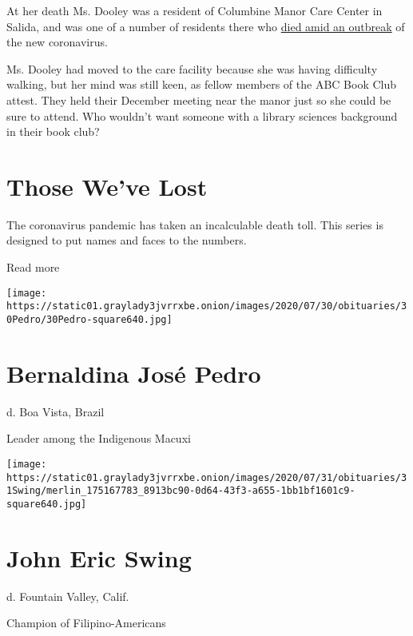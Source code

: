 At her death Ms. Dooley was a resident of Columbine Manor Care Center in
Salida, and was one of a number of residents there who
\href{https://arkvalleyvoice.com/four_additional_covid_19_cases_staff_at-columbine_manor/}{died
amid an outbreak} of the new coronavirus.

Ms. Dooley had moved to the care facility because she was having
difficulty walking, but her mind was still keen, as fellow members of
the ABC Book Club attest. They held their December meeting near the
manor just so she could be sure to attend. Who wouldn't want someone
with a library sciences background in their book club?

\href{https://www.nytimes3xbfgragh.onion/interactive/2020/obituaries/people-died-coronavirus-obituaries.html?action=click\&pgtype=Article\&state=default\&region=BELOW_MAIN_CONTENT\&context=covid_obits_promo}{}

\hypertarget{those-weve-lost}{%
\section{Those We've Lost}\label{those-weve-lost}}

The coronavirus pandemic has taken an incalculable death toll. This
series is designed to put names and faces to the numbers.

Read more

\texttt{[image: https://static01.graylady3jvrrxbe.onion/images/2020/07/30/obituaries/30Pedro/30Pedro-square640.jpg]}

\hypertarget{bernaldina-josuxe9-pedro}{%
\section{Bernaldina José Pedro}\label{bernaldina-josuxe9-pedro}}

d. Boa Vista, Brazil

Leader among the Indigenous Macuxi

\texttt{[image: https://static01.graylady3jvrrxbe.onion/images/2020/07/31/obituaries/31Swing/merlin\_175167783\_8913bc90-0d64-43f3-a655-1bb1bf1601c9-square640.jpg]}

\hypertarget{john-eric-swing}{%
\section{John Eric Swing}\label{john-eric-swing}}

d. Fountain Valley, Calif.

Champion of Filipino-Americans

